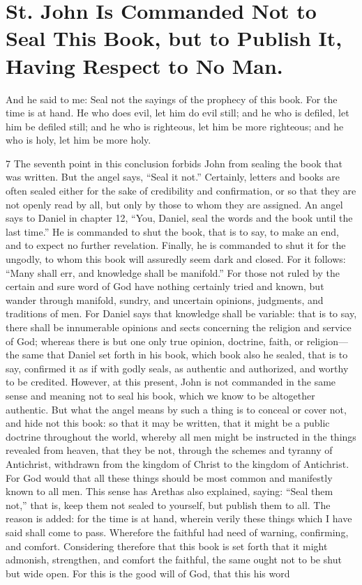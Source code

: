 \chapter[Sermon 98. St. John Is Commanded Not to Seal This Book, but to Publish It, Having Respect to No Man.]{St. John Is Commanded Not to Seal This Book, but to Publish It, Having Respect to No Man.}
\label{sermon:098}

And he said to me: Seal not the sayings of the prophecy of this book. For the time is at hand. He who does evil, let him do evil still; and he who is defiled, let him be defiled still; and he who is righteous, let him be more righteous; and he who is holy, let him be more holy.

7 The seventh point in this conclusion forbids John from sealing the book that was written. But the angel says, “Seal it not.” Certainly, letters and books are often sealed either for the sake of credibility and confirmation, or so that they are not openly read by all, but only by those to whom they are assigned. An angel says to Daniel in chapter 12, “You, Daniel, seal the words and the book until the last time.” He is commanded to shut the book, that is to say, to make an end, and to expect no further revelation. Finally, he is commanded to shut it for the ungodly, to whom this book will assuredly seem dark and closed. For it follows: “Many shall err, and knowledge shall be manifold.” For those not ruled by the certain and sure word of God have nothing certainly tried and known, but wander through manifold, sundry, and uncertain opinions, judgments, and traditions of men. For Daniel says that knowledge shall be variable: that is to say, there shall be innumerable opinions and sects concerning the religion and service of God; whereas there is but one only true opinion, doctrine, faith, or religion—the same that Daniel set forth in his book, which book also he sealed, that is to say, confirmed it as if with godly seals, as authentic and authorized, and worthy to be credited. However, at this present, John is not commanded in the same sense and meaning not to seal his book, which we know to be altogether authentic. But what the angel means by such a thing is to conceal or cover not, and hide not this book: so that it may be written, that it might be a public doctrine throughout the world, whereby all men might be instructed in the things revealed from heaven, that they be not, through the schemes and tyranny of Antichrist, withdrawn from the kingdom of Christ to the kingdom of Antichrist. For God would that all these things should be most common and manifestly known to all men. This sense has Arethas also explained, saying: “Seal them not,” that is, keep them not sealed to yourself, but publish them to all. The reason is added: for the time is at hand, wherein verily these things which I have said shall come to pass. Wherefore the faithful had need of warning, confirming, and comfort. Considering therefore that this book is set forth that it might admonish, strengthen, and comfort the faithful, the same ought not to be shut but wide open. For this is the good will of God, that this his word 